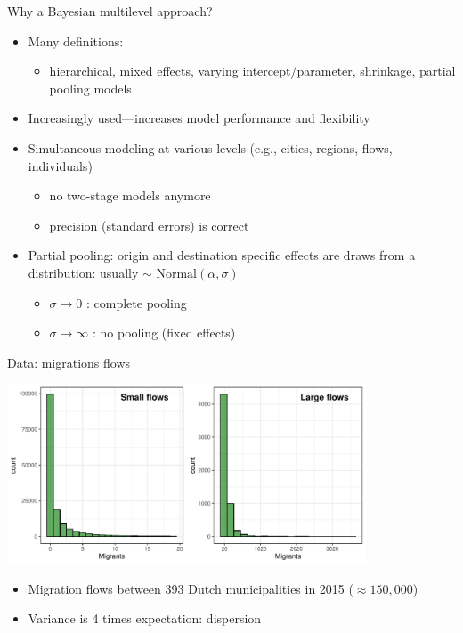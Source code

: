 \documentclass{beamer}
\begin{document}
\begin{frame}{Why a Bayesian multilevel approach?}
\begin{itemize}
	 \item Many definitions:
	\begin{itemize}
		\item hierarchical, mixed effects, varying intercept/parameter, shrinkage, partial pooling models\pause
	\end{itemize}
	\item Increasingly used---increases model \alert{performance} and \alert{flexibility} \pause
    \item \alert{Simultaneous} modeling at various levels (e.g., cities, regions, flows, individuals) 
    \begin{itemize}
    	\item no two-stage models anymore 
    	\item precision (standard errors) is correct\pause
    \end{itemize}
	\item \alert{Partial pooling}: origin and destination specific effects are draws from a distribution: usually $\sim \text{ Normal}(\alpha, \sigma)$
	\begin{itemize}
		\item $\sigma \longrightarrow 0$ : complete pooling
		\item $\sigma \longrightarrow \infty$ : no pooling (fixed effects)
	\end{itemize}
\end{itemize}
\end{frame}

\begin{frame}{Data: migrations flows}
	\begin{center}
		\includegraphics[width=0.8\textwidth]{../fig/hist_mig}      
	\end{center}
\begin{itemize}
	\item Migration flows \alert{between} 393 Dutch municipalities in 2015 ($\approx 150,000$)
	\item Variance is 4 times expectation: \alert{dispersion}
\end{itemize}
\end{frame}
\end{document}
